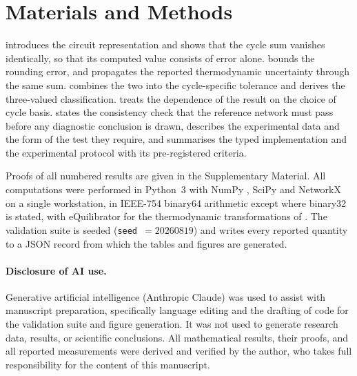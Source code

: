 \documentclass[11pt,a4paper]{article}
\theoremstyle{pstyle}
\theoremstyle{definition}
\theoremstyle{remark}
\begin{document}
\section{Materials and Methods}
\label{sec:methods}

 introduces the circuit representation and shows that
the cycle sum vanishes identically, so that its computed value consists
of error alone.  bounds the rounding error,
and  propagates the reported thermodynamic
uncertainty through the same sum.  combines the two
into the cycle-specific tolerance and derives the three-valued
classification.  treats the dependence of the result on
the choice of cycle basis.  states the consistency
check that the reference network must pass before any diagnostic
conclusion is drawn,  describes the experimental data
and the form of the test they require, and 
summarises the typed implementation and the experimental protocol with
its pre-registered criteria.

Proofs of all numbered results are given in the Supplementary Material.
All computations were performed in Python~3 with NumPy \cite{harris2020},
SciPy \cite{virtanen2020} and NetworkX \cite{hagberg2008} on a single
workstation, in IEEE-754 binary64 arithmetic except where binary32 is
stated, with eQuilibrator \citep{beber2022} for the thermodynamic
transformations of . The validation suite is seeded
(\texttt{seed}~$=20260819$) and writes every reported quantity to a JSON
record from which the tables and figures are generated.

\paragraph{Disclosure of AI use.} Generative artificial intelligence
(Anthropic Claude) was used to assist with manuscript preparation,
specifically language editing and the drafting of code for the
validation suite and figure generation. It was not used to generate
research data, results, or scientific conclusions. All mathematical
results, their proofs, and all reported measurements were derived and
verified by the author, who takes full responsibility for the content
of this manuscript.
\end{document}
